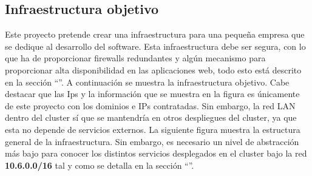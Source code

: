 \subsection{Infraestructura objetivo}
\label{infraestructura_objetivo}
\begin{text}
	Este proyecto pretende crear una infraestructura para una pequeña empresa que se dedique al desarrollo del software. Esta infraestructura debe ser segura, con lo que ha de proporcionar firewalls redundantes y algún mecanismo para proporcionar alta disponibilidad en las aplicaciones web, todo esto está descrito en la sección ``''.  A continuación se muestra la infraestructura objetivo. Cabe destacar que las Ips y la información que se muestra en la figura es únicamente de este proyecto con los dominios e IPs contratadas. Sin embargo, la red LAN dentro del cluster sí que se mantendría en otros despliegues del cluster, ya que esta no depende de servicios externos. La siguiente figura muestra la estructura general de la infraestructura. Sin embargo, es necesario un nivel de abstracción más bajo para conocer los distintos servicios desplegados en el cluster bajo la red \textbf{10.6.0.0/16} tal y como se detalla en la sección ``''.
	
	\clearpage
	

\end{text}

